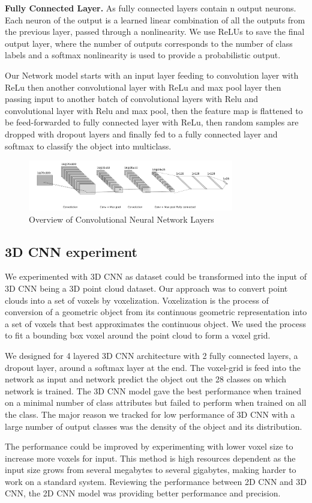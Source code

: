 \textbf{Fully Connected Layer.}
As fully connected layers contain n output neurons. Each neuron of the output is a learned linear
combination of all the outputs from the previous layer, passed through a nonlinearity.
We use ReLUs to save the final output layer, where the number of outputs corresponds
to the number of class labels and a softmax nonlinearity is used to provide a probabilistic output.


Our Network model starts with an input layer feeding to convolution layer with ReLu then
another convolutional layer with ReLu and max pool layer then passing input to another batch of convolutional layers
with Relu and convolutional layer with Relu and max pool, then the feature map is flattened to be feed-forwarded to
fully connected layer with ReLu, then random samples are dropped with dropout layers
and finally fed to a fully connected layer and softmax to classify the object into multiclass.

\begin{figure}[!h]
     \begin{center}
       \includegraphics[width=0.8\textwidth]{./images/object_net.pdf}
       \caption{Overview of Convolutional Neural Network Layers}
       \label{fig:cnn}
     \end{center}
\end{figure}

\subsection{3D CNN experiment}
We experimented with 3D CNN as dataset could be transformed into the input of 3D CNN being a 3D point cloud dataset. 
Our approach was to convert point clouds into a set of voxels by voxelization. Voxelization is the process of conversion 
of a geometric object from its continuous geometric representation into a set of voxels that best approximates the continuous
object. We used the process to fit a bounding box voxel around the point cloud to form a voxel grid.

We designed for 4 layered 3D CNN architecture with 2 fully connected layers, a dropout layer, around a softmax layer at the end. 
The voxel-grid is feed into the network as input and network predict the object out the 28 classes on which network is trained. 
The 3D CNN model gave the best performance when trained on a minimal number of class attributes but failed to perform when trained on all the class. 
The major reason we tracked for low performance of 3D CNN with a large number of output classes was the density of the object and its distribution.

The performance could be improved by experimenting with lower voxel size to increase more voxels for input. 
This method is high resources dependent as the input size grows from several megabytes to several gigabytes, making harder to work on a standard system.
Reviewing the performance between 2D CNN and 3D CNN, the 2D CNN model was providing better performance and precision.
